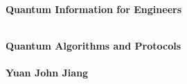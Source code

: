 %

\thispagestyle{empty}

\vspace{3cm}
  \begin{center}
	\bfseries \Huge Quantum Information for Engineers \par   %
        ~\\
	\bfseries \LARGE Quantum Algorithms and Protocols \\   %
        ~\\
        \bfseries \Large Yuan John Jiang \par   %

        \vspace{3cm}
    
    \end{center}
    
\par

\newpage
